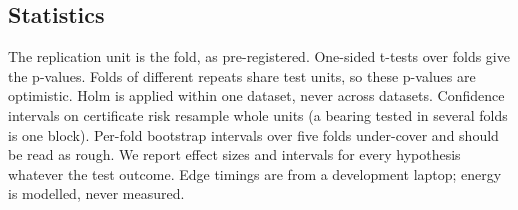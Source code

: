 \subsection{Statistics}

The replication unit is the fold, as pre-registered. One-sided t-tests over folds give the
p-values. Folds of different repeats share test units, so these p-values are optimistic. Holm is
applied within one dataset, never across datasets. Confidence intervals on certificate risk
resample whole units (a bearing tested in several folds is one block). Per-fold bootstrap intervals
over five folds under-cover and should be read as rough. We report effect sizes and intervals for
every hypothesis whatever the test outcome. Edge timings are from a development laptop; energy is
modelled, never measured.
